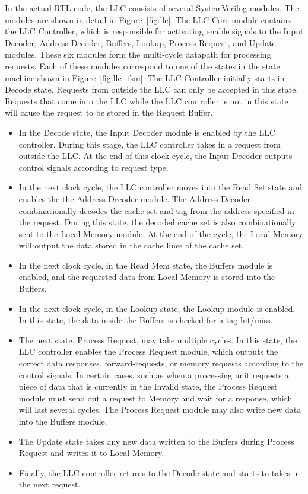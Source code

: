 \documentclass{sig-alternate}
\begin{document}
\par In the actual RTL code, the LLC consists of several SystemVerilog modules. The modules are shown in detail in Figure~\ref{fig:llc}.
  The LLC Core module contains the LLC Controller, which is responsible for activating enable signals to the Input Decoder, Address Decoder, Buffers, Lookup, Process Request, and Update modules.
  These six modules form the multi-cycle datapath for processing requests.
  Each of these modules correspond to one of the states in the state machine shown in Figure~\ref{fig:llc_fsm}.
 The LLC Controller initially starts in Decode state. Requests from outside the LLC can only be accepted in this state. Requests 
 that come into the LLC while the LLC controller is not in this state will cause the request to be stored in the Request Buffer.
\begin{itemize}
  \item In the Decode state, the Input Decoder module is enabled by the LLC controller. During this stage, the LLC controller takes in a request from
  outside the LLC. At the end of this clock cycle, the Input Decoder outputs control signals according to request type.
  \item In the next clock cycle, the LLC controller moves into the Read Set state and enables the
  the Address Decoder module. The Address Decoder combinationally decodes the cache set and tag from the address specified in the request.
   During this state, the decoded cache set is also combinationally sent to the Local Memory module. At the end of the cycle, the Local Memory will output the data stored in the cache lines of the cache set.
  \item In the next clock cycle, in the
  Read Mem state, the Buffers module is enabled, and the requested data from Local Memory is stored into the Buffers.
  \item In the next clock cycle, in the Lookup state, the Lookup 
  module is enabled. In this state, the data inside the Buffers is checked for a tag hit/miss.
  \item The next state, Process Request, may take multiple cycles. In this state, the LLC controller enables the Process Request module, which outputs the correct data responses, forward-requests,
  or memory requests according to the control signals. In certain cases, such as when a processing unit requests a piece of data that is currently
  in the Invalid state, the Process Request module must send out a request to Memory and wait for a response, which will last several cycles. The Process Request module may also write new data into the Buffers module.
  \item The Update state takes any new data written to the Buffers during Process Request and writes it to Local Memory.
  \item Finally, the LLC controller returns to the Decode state and starts to takes in the next request.
\end{itemize}
\end{document}
